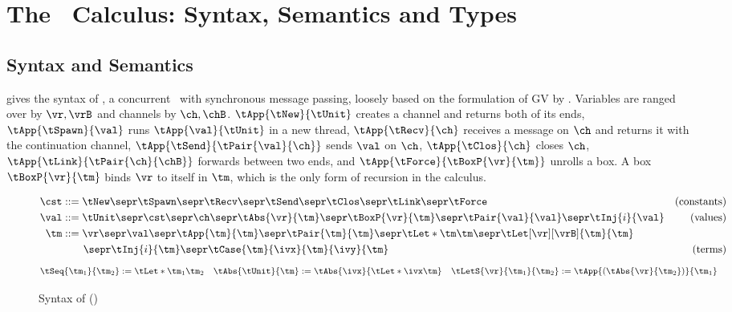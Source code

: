 \section{The \OurLang\ Calculus: Syntax, Semantics and Types}
\label{sec:calculus}

\subsection{Syntax and Semantics}

 gives the syntax of \OurLang, a concurrent \lcalc\ with
synchronous message passing, loosely based on the formulation of GV by
\citet{conf/esop/LindleyM15}.
Variables are ranged over by $\vr, \vrB$ and channels by $\ch, \chB$.
$\tApp{\tNew}{\tUnit}$ creates a channel and returns both of its ends,
$\tApp{\tSpawn}{\val}$ runs $\tApp{\val}{\tUnit}$ in a new thread,
$\tApp{\tRecv}{\ch}$ receives a message on $\ch$ and returns it with the
continuation channel,
$\tApp{\tSend}{\tPair{\val}{\ch}}$ sends $\val$ on $\ch$,
$\tApp{\tClos}{\ch}$ closes $\ch$,
$\tApp{\tLink}{\tPair{\ch}{\chB}}$ forwards between two ends, and
$\tApp{\tForce}{\tBoxP{\vr}{\tm}}$ unrolls a box.
A box $\tBoxP{\vr}{\tm}$ binds $\vr$ to itself in $\tm$, which is the
only form of recursion in the calculus.

\begin{figure}[thp]
  \adjustfigure[]
  \begin{align*}
    \cst &::=
      \tNew \sepr \tSpawn \sepr \tRecv \sepr \tSend \sepr
      \tClos \sepr \tLink \sepr \tForce
    & \text{(constants)}
    \\
    \val &::=
      \tUnit \sepr \cst \sepr \ch \sepr \tAbs{\vr}{\tm} \sepr
      \tBoxP{\vr}{\tm} \sepr \tPair{\val}{\val} \sepr \tInj{i}{\val}
    & \text{(values)}
    \\
    \tm &::=
      \vr \sepr \val \sepr \tApp{\tm}{\tm} \sepr \tPair{\tm}{\tm} \sepr
      \tLet*{\tm}{\tm} \sepr \tLet[\vr][\vrB]{\tm}{\tm}
    \\ & \qquad {}\sepr
      \tInj{i}{\tm} \sepr \tCase{\tm}{\ivx}{\tm}{\ivy}{\tm}
    & \text{(terms)}
  \end{align*}
  \begin{align*}
    \tSeq{\tm_1}{\tm_2} &:= \tLet*{\tm_1}{\tm_2}
    &
    \tAbs{\tUnit}{\tm} &:= \tAbs{\ivx}{\tLet*{\ivx}{\tm}}
    &
    \tLetS{\vr}{\tm_1}{\tm_2} &:= \tApp{(\tAbs{\vr}{\tm_2})}{\tm_1}
  \end{align*}
  \caption{Syntax of \OurLang ()}
  \label{fig:syntax}
\end{figure}

